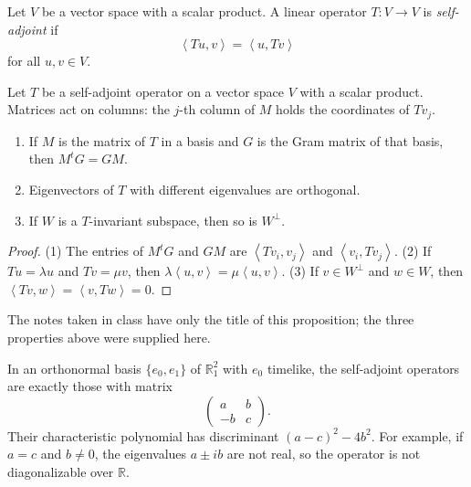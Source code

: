\begin{definition}
\label{definition-palmas-self-adjoint}
Let $V$ be a vector space with a scalar
product. A linear operator
$T\colon V\to V$ is \emph{self-adjoint} if
$$
\left\langle{} Tu,v \right\rangle{}
=\left\langle{} u,Tv \right\rangle{}
$$
for all $u,v\in V$.
\end{definition}

\begin{proposition}
\label{proposition-palmas-self-adjoint}
Let $T$ be a self-adjoint operator on a
vector space $V$ with a scalar product.
Matrices act on columns: the $j$-th column
of $M$ holds the coordinates of $Tv_j$.
\begin{enumerate}
\item If $M$ is the matrix of $T$ in a
basis and $G$ is the Gram matrix of that
basis, then $M^{t}G=GM$.
\item Eigenvectors of $T$ with different
eigenvalues are orthogonal.
\item If $W$ is a $T$-invariant subspace,
then so is $W^{\perp}$.
\end{enumerate}
\end{proposition}

\begin{proof}
(1) The entries of $M^tG$ and $GM$ are
$\left\langle{} Tv_i,v_j \right\rangle{}$
and $\left\langle{} v_i,Tv_j
\right\rangle{}$.
(2) If $Tu=\lambda u$ and $Tv=\mu v$, then
$\lambda\left\langle{} u,v \right\rangle{}
=\mu\left\langle{} u,v \right\rangle{}$.
(3) If $v\in W^{\perp}$ and $w\in W$, then
$\left\langle{} Tv,w \right\rangle{}
=\left\langle{} v,Tw \right\rangle{}=0$.
\end{proof}

The notes taken in class have only the
title of this proposition; the three
properties above were supplied here.

\begin{example}
\label{example-palmas-self-adjoint-plane}
In an orthonormal basis $\{e_0,e_1\}$ of
$\mathbb{R}^2_1$ with $e_0$ timelike, the
self-adjoint operators are exactly those
with matrix
$$
\begin{pmatrix}
a & b\\
-b & c
\end{pmatrix}.
$$
Their characteristic polynomial has
discriminant $(a-c)^2-4b^2$. For example,
if $a=c$ and $b\neq 0$, the eigenvalues
$a\pm ib$ are not real, so the operator is
not diagonalizable over $\mathbb{R}$.
\end{example}

